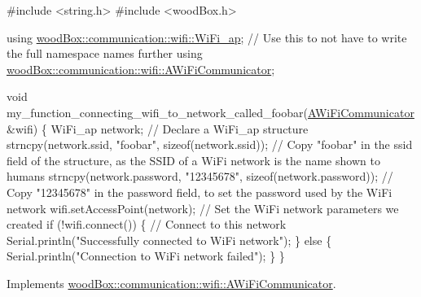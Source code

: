 \begin{DoxyCode}
\textcolor{preprocessor}{#include <string.h>}
\textcolor{preprocessor}{#include <woodBox.h>}

\textcolor{keyword}{using} \mbox{\hyperlink{structwood_box_1_1communication_1_1wifi_1_1s__wifi__access__point}{woodBox::communication::wifi::WiFi\_ap}}; \textcolor{comment}{// Use this to not have
       to write the full namespace names further}
\textcolor{keyword}{using} \mbox{\hyperlink{classwood_box_1_1communication_1_1wifi_1_1_a_wi_fi_communicator}{woodBox::communication::wifi::AWiFiCommunicator}};

\textcolor{keywordtype}{void} my\_function\_connecting\_wifi\_to\_network\_called\_foobar(\mbox{\hyperlink{classwood_box_1_1communication_1_1wifi_1_1_a_wi_fi_communicator_a9d1dc13ca9243170b04211bef2b86ed2}{AWiFiCommunicator}} &wifi) \{
  WiFi\_ap network; \textcolor{comment}{// Declare a WiFi\_ap structure}
  strncpy(network.ssid, \textcolor{stringliteral}{"foobar"}, \textcolor{keyword}{sizeof}(network.ssid)); \textcolor{comment}{// Copy "foobar" in the ssid field of the
       structure, as the SSID of a WiFi network is the name shown to humans}
  strncpy(network.password, \textcolor{stringliteral}{"12345678"}, \textcolor{keyword}{sizeof}(network.password)); \textcolor{comment}{// Copy "12345678" in the password
       field, to set the password used by the WiFi network}
  wifi.setAccessPoint(network); \textcolor{comment}{// Set the WiFi network parameters we created}
  \textcolor{keywordflow}{if} (!wifi.connect()) \{ \textcolor{comment}{// Connect to this network}
    Serial.println(\textcolor{stringliteral}{"Successfully connected to WiFi network"});
  \} \textcolor{keywordflow}{else} \{
    Serial.println(\textcolor{stringliteral}{"Connection to WiFi network failed"});
  \}
\}
\end{DoxyCode}
 

Implements \mbox{\hyperlink{classwood_box_1_1communication_1_1wifi_1_1_a_wi_fi_communicator_a7c4763c1594a4b934e5a39e90b271799}{wood\+Box\+::communication\+::wifi\+::\+A\+Wi\+Fi\+Communicator}}.

\mbox{\label{classwood_box_1_1communication_1_1wifi_1_1_e_s_p8266_wi_fi_communicator_a0875cf7209c48069d22270eaeb2cac0f}} 
